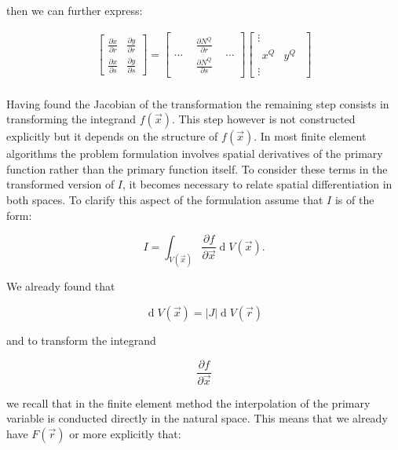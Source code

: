 then we can further express:

\begin{equation}
\begin{array}{l}\begin{bmatrix}\frac{\partial x}{\partial r}&\frac{\partial y}{\partial r}\\\frac{\partial x}{\partial s}&\frac{\partial y}{\partial s}\end{bmatrix}=\begin{bmatrix}\cdots&\begin{array}{c}\frac{\partial N^Q}{\partial r}\\\frac{\partial N^Q}{\partial s}\end{array}&\cdots\end{bmatrix}\begin{bmatrix}\vdots\\\begin{array}{cc}x^Q&y^Q\end{array}\\\vdots\end{bmatrix}\\\end{array}
\label{eq:jac}
\end{equation}

Having found the Jacobian of the transformation the remaining step consists in transforming the integrand $f(\overrightarrow{x})$. This step however is not constructed explicitly  but it depends on the structure of $f(\overrightarrow{x})$. In most finite element algorithms the problem formulation involves spatial derivatives of the primary function rather than the primary function itself. To consider these terms in the transformed version of $I$, it becomes necessary to relate spatial differentiation in both spaces. To clarify this aspect of the formulation assume that $I$ is of the form:

\[I=\int_{V(\overrightarrow x)}\frac{\partial f}{\partial\overrightarrow x}\operatorname dV(\overrightarrow x).\]

We already found that

\[\operatorname dV(\overrightarrow x)=\left|J\right|\operatorname dV(\overrightarrow r)\]

and to transform the integrand


\[\frac{\partial f}{\partial\overrightarrow x}\]

we recall that in the finite element method the interpolation of the primary variable is conducted directly in the natural space. This means that we already have $F(\overrightarrow r)$ or more explicitly that:





